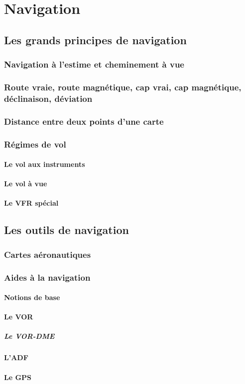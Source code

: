 \section{Navigation}
	\subsection{Les grands principes de navigation}
		\subsubsection{Navigation à l'estime et cheminement à vue}
		\subsubsection{Route vraie, route magnétique, cap vrai, cap magnétique, déclinaison, déviation}
		\subsubsection{Distance entre deux points d'une carte}
		\subsubsection{Régimes de vol}
		\paragraph{Le vol aux instruments}
		\paragraph{Le vol à vue}
		\paragraph{Le VFR spécial} 
	
	\subsection{Les outils de navigation}
		\subsubsection{Cartes aéronautiques}
		
		\subsubsection{Aides à la navigation}
			\paragraph{Notions de base}
			
			\paragraph{Le VOR}
			
			\subparagraph{Le VOR-DME}
			
			\paragraph{L'ADF}
			
			\paragraph{Le GPS}